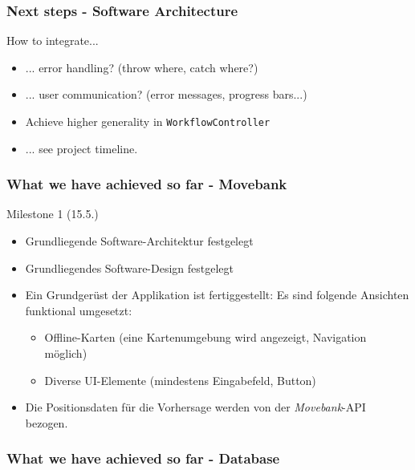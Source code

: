 \documentclass[xcolor=dvipsnames]{beamer}
\begin{document}
\begin{frame}
	\frametitle{Next steps - Software Architecture}
	How to integrate...
	\begin{itemize}
		\item ... error handling? (throw where, catch where?)
		\item ... user communication? (error messages, progress bars...)
	\end{itemize}
	\lstset{style=normalstyle}
	\begin{itemize}
		\item Achieve higher generality in \lstinline$WorkflowController$
	\end{itemize}
	\begin{itemize} 
	 	 \item ... see project timeline. 
	\end{itemize} 
\end{frame}




\begin{frame}
	\frametitle{What we have achieved so far - Movebank}
	\Large{Milestone 1 (15.5.)}
	\normalsize
	\begin{itemize} 
		\item \color{LightGray}Grundliegende Software-Architektur festgelegt
		\item \color{LightGray}Grundliegendes Software-Design festgelegt
		\item \color{LightGray}Ein Grundgerüst der Applikation ist fertiggestellt: Es sind folgende Ansichten funktional umgesetzt:
		\begin{itemize} 
			\item \color{LightGray}Offline-Karten (eine Kartenumgebung wird angezeigt, Navigation möglich)
			\item \color{LightGray}Diverse UI-Elemente (mindestens Eingabefeld, Button)
		\end{itemize} 
		\item \color{Green}Die Positionsdaten für die Vorhersage werden von der \textit{Movebank}-API bezogen.
	\end{itemize}     
\end{frame}




\begin{frame}
	\frametitle{What we have achieved so far - Database}
    

    
\end{frame}
\end{document}
